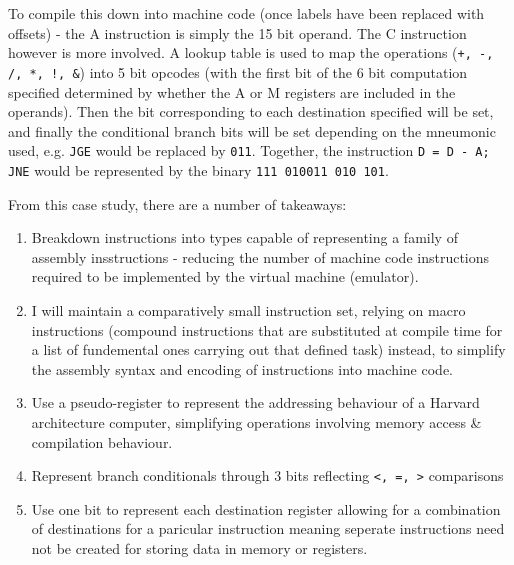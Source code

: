 To compile this down into machine code (once labels have been replaced with offsets) - the A instruction is simply the 15 bit operand. The C instruction however is more involved. A lookup table is used to map the operations (\texttt{+, -, /, *, !, \&}) into 5 bit opcodes (with the first bit of the 6 bit computation specified determined by whether the A or M registers are included in the operands). Then the bit corresponding to each destination specified will be set, and finally the conditional branch bits will be set depending on the mneumonic used, e.g. \texttt{JGE} would be replaced by \texttt{011}. Together, the instruction \texttt{D = D - A; JNE} would be represented by the binary \texttt{111 010011 010 101}. 

From this case study, there are a number of takeaways:
\begin{enumerate}
    \item Breakdown instructions into types capable of representing a family of assembly insstructions - reducing the number of machine code instructions required to be implemented by the virtual machine (emulator).
    \item I will maintain a comparatively small instruction set, relying on macro instructions (compound instructions that are substituted at compile time for a list of fundemental ones carrying out that defined task) instead, to simplify the assembly syntax and encoding of instructions into machine code.
    \item Use a pseudo-register to represent the addressing behaviour of a Harvard architecture computer, simplifying operations involving memory access \& compilation behaviour.
    \item Represent branch conditionals through 3 bits reflecting \texttt{<, =, >} comparisons  
    \item Use one bit to represent each destination register allowing for a combination of destinations for a paricular instruction meaning seperate instructions need not be created for storing data in memory or registers.
\end{enumerate}

